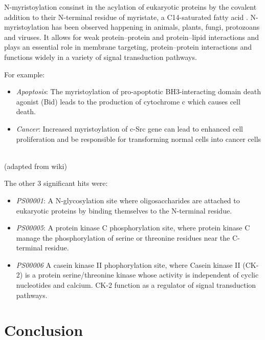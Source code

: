\documentclass[10pt,twocolumn,letterpaper]{article}
\begin{document}
N-myristoylation consinst in the acylation of eukaryotic proteins by the covalent addition to their N-terminal residue of myristate, a C14-saturated fatty acid \cite{N-myristoylation}.
N-myristoylation has been observed happening in animals, plants, fungi, protozoans and viruses. It allows for weak protein–protein and protein–lipid interactions and plays an essential role in membrane targeting, protein–protein interactions and functions widely in a variety of signal transduction pathways. 

For example:
\begin{itemize}
    \item \textit{Apoptosis}: The myristoylation of pro-apoptotic BH3-interacting domain death agonist (Bid) leads to the production of cytochrome c which causes cell death.

    \item \textit{Cancer}: Increased myristoylation of c-Src gene can lead to enhanced cell proliferation and be responsible for transforming normal cells into cancer cells
\end{itemize} \\

(adapted from wiki)

The other 3 significant hits were: 
\begin{itemize}
\item \textit{PS00001}: A N-glycosylation site where oligosaccharides are attached to eukaryotic proteins by binding themselves to the N-terminal residue.
\item \textit{PS00005}: A protein kinase C phosphorylation site, where protein kinase C manage the phosphorylation of serine or threonine residues near the C-terminal residue.
\item \textit{PS00006} A casein kinase II phophorylation site, where Casein kinase II (CK-2) is a protein serine/threonine kinase whose activity is independent of cyclic nucleotides and calcium. CK-2 function as a regulator of signal transduction pathways.
\end{itemize}



\section{Conclusion}





{\small


}
\end{document}
